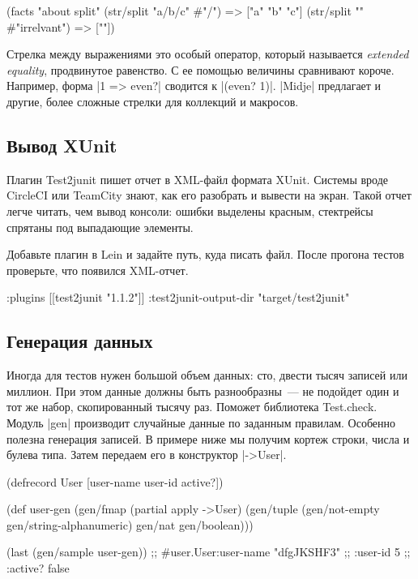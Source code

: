 \begin{english}
  \begin{clojure}
(facts "about split"
 (str/split "a/b/c" #"/") => ["a" "b" "c"]
 (str/split "" #"irrelvant") => [""])
  \end{clojure}
\end{english}

Стрелка между выражениями это особый оператор, который называется
\emph{extended equality}, продвинутое равенство. С ее помощью величины сравнивают
короче. Например, форма \spverb|1 => even?| сводится к \spverb|(even? 1)|.
\spverb|Midje| предлагает и другие, более сложные стрелки для коллекций и
макросов.

\subsection{Вывод XUnit}

Плагин Test2junit пишет отчет
в XML-файл формата XUnit. Системы вроде CircleCI или TeamCity знают, как его
разобрать и вывести на экран. Такой отчет легче читать, чем вывод консоли:
ошибки выделены красным, стектрейсы спрятаны под выпадающие элементы.

Добавьте плагин в Lein и задайте путь, куда писать файл. После прогона тестов
проверьте, что появился XML-отчет.

\begin{english}
  \begin{clojure}
:plugins [[test2junit "1.1.2"]]
:test2junit-output-dir "target/test2junit"
  \end{clojure}
\end{english}

\subsection{Генерация данных}

Иногда для тестов нужен большой объем данных: сто, двести тысяч записей или
миллион. При этом данные должны быть разнообразны~--- не подойдет один и тот же
набор, скопированный тысячу раз. Поможет библиотека
Test.check. Модуль \spverb|gen|
производит случайные данные по заданным правилам. Особенно полезна генерация
записей. В примере ниже мы получим кортеж строки, числа и булева типа. Затем
передаем его в конструктор \spverb|->User|.

\begin{english}
  \begin{clojure}
(defrecord User [user-name user-id active?])

(def user-gen
  (gen/fmap (partial apply ->User)
            (gen/tuple (gen/not-empty gen/string-alphanumeric)
                       gen/nat
                       gen/boolean)))

(last (gen/sample user-gen))
;; #user.User{:user-name "dfgJKSHF3"
;;            :user-id 5
;;            :active? false}
  \end{clojure}
\end{english}

